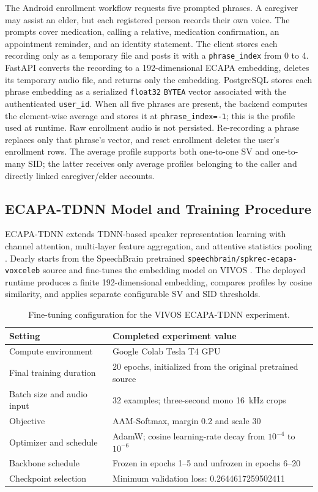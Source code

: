 The Android enrollment workflow requests five prompted phrases. A caregiver may assist an elder, but each registered person records their own voice. The prompts cover medication, calling a relative, medication confirmation, an appointment reminder, and an identity statement. The client stores each recording only as a temporary file and posts it with a \texttt{phrase\_index} from 0 to 4. FastAPI converts the recording to a 192-dimensional ECAPA embedding, deletes its temporary audio file, and returns only the embedding. PostgreSQL stores each phrase embedding as a serialized \texttt{float32} \texttt{BYTEA} vector associated with the authenticated \texttt{user\_id}. When all five phrases are present, the backend computes the element-wise average and stores it at \texttt{phrase\_index=-1}; this is the profile used at runtime. Raw enrollment audio is not persisted. Re-recording a phrase replaces only that phrase's vector, and reset enrollment deletes the user's enrollment rows. The average profile supports both one-to-one SV and one-to-many SID; the latter receives only average profiles belonging to the caller and directly linked caregiver/elder accounts.

\subsection{ECAPA-TDNN Model and Training Procedure}
ECAPA-TDNN extends TDNN-based speaker representation learning with channel attention, multi-layer feature aggregation, and attentive statistics pooling \cite{ecapa}. Dearly starts from the SpeechBrain pretrained \texttt{speechbrain/spkrec-ecapa-voxceleb} source and fine-tunes the embedding model on VIVOS \cite{speechbrain}. The deployed runtime produces a finite 192-dimensional embedding, compares profiles by cosine similarity, and applies separate configurable SV and SID thresholds.

\begin{table}[H]
\centering
\begin{tabularx}{\textwidth}{lX}
\toprule
\textbf{Setting} & \textbf{Completed experiment value} \\
\midrule
Compute environment & Google Colab Tesla T4 GPU \\
Final training duration & 20 epochs, initialized from the original pretrained source \\
Batch size and audio input & 32 examples; three-second mono 16~kHz crops \\
Objective & AAM-Softmax, margin 0.2 and scale 30 \\
Optimizer and schedule & AdamW; cosine learning-rate decay from $10^{-4}$ to $10^{-6}$ \\
Backbone schedule & Frozen in epochs 1--5 and unfrozen in epochs 6--20 \\
Checkpoint selection & Minimum validation loss: 0.2644617259502411 \\
\bottomrule
\end{tabularx}
\caption{Fine-tuning configuration for the VIVOS ECAPA-TDNN experiment.}
\label{tab:training-config}
\end{table}

